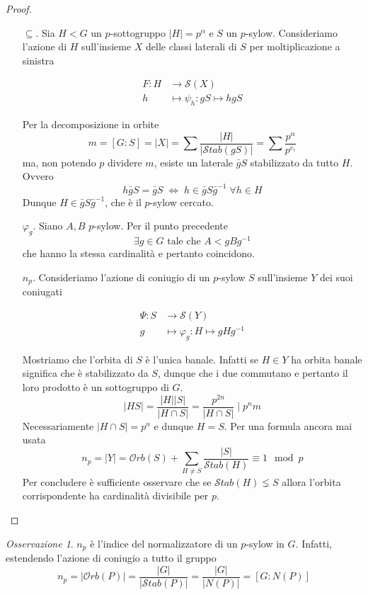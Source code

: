 \documentclass[a4paper]{article}
\theoremstyle{remark}
\newtheorem*{remark}{Osservazione}
\theoremstyle{definition}
\newcommand{\Orb}[1]{\mathcal{O}rb\left( #1 \right)}
\newcommand{\Stab}[1]{\mathcal{S}tab\left( #1 \right)}
\newcommand{\fun}[5]{
	\begin{align*}
	#1 \colon #2 &\to #3 \\
	#4 &\mapsto #5
	\end{align*}
}
\begin{document}
\begin{multicols}{2}
\begin{proof}
\begin{itemize}
		\item[$ \subseteq $.] Sia $ H < G $ un $ p $-sottogruppo $ |H| = p^\alpha $ e $ S $ un $ p $-sylow. Consideriamo l'azione di $ H $ sull'insieme $ X $ delle classi laterali di $ S $ per moltiplicazione a sinistra
		\fun{F}{H}{\mathcal{S}(X)}{h}{\psi_h : gS \mapsto hgS}
		Per la decomposizione in orbite
		\[ m=[G:S]=|X| = \sum\frac{|H|}{|\Stab{gS}|} = \sum\frac{p^\alpha}{p^{e_i}} \]
		ma, non potendo $ p $ dividere $ m $, esiste un laterale $ \bar{g}S $ stabilizzato da tutto $ H $. Ovvero
		\[ h\bar{g}S = \bar{g}S \;\Leftrightarrow\; h \in \bar{g}S\bar{g}^{-1} \; \forall h \in H \]
		Dunque $ H \in \bar{g}S\bar{g}^{-1} $, che è il $ p $-sylow cercato.
		
		\item[$ \varphi_g $.] Siano $ A, B $ $ p $-sylow. Per il punto precedente  \[ \exists g \in G \text{ tale che } A < gBg^{-1} \]
		che hanno la stessa cardinalità e pertanto coincidono.
		\item[$ n_p $.] Consideriamo l'azione di coniugio di un $ p $-sylow $ S $ sull'insieme $ Y $ dei suoi coniugati
		\fun{\Psi}{S}{\mathcal{S}(Y)}{g}{\varphi_g: H \mapsto gHg^{-1}}
		Mostriamo che l'orbita di $ S $ è l'unica banale. Infatti se $ H \in Y $ ha orbita banale significa che è stabilizzato da $ S $, dunque che i due commutano e pertanto il loro prodotto è un sottogruppo di $ G $. \[ |HS| = \frac{|H||S|}{|H \cap S|} = \frac{p^{2n}}{|H \cap S|} \mid p^nm \] Necessariamente $ |H \cap S| = p^n $ e dunque $ H = S $. Per una formula ancora mai usata
		\[ n_p = |Y| = \Orb{S} + \sum_{H \neq S}\frac{|S|}{\Stab{H}} \equiv 1 \mod{p} \]
		Per concludere è sufficiente osservare che se $ \Stab{H} \lneq S $ allora l'orbita corrispondente ha cardinalità divisibile per $ p $.
	\end{itemize}
\end{proof}

\begin{remark}
	$ n_p $ è l'indice del normalizzatore di un $ p$-sylow in $ G $. Infatti, estendendo l'azione di coniugio a tutto il gruppo
	\[ n_p = |\Orb{P}| = \frac{|G|}{|\Stab{P}|} = \frac{|G|}{|N(P)|} = [G : N(P)] \]
\end{remark}


\end{multicols}
\end{document}
